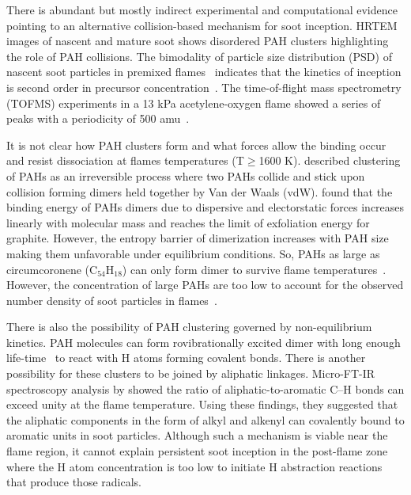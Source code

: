 There is abundant but mostly indirect experimental and computational evidence pointing to an alternative collision-based mechanism for soot inception. HRTEM images of
nascent and mature soot shows disordered PAH clusters highlighting the role of PAH collisions. 
The bimodality of particle size distribution (PSD) of nascent soot particles in premixed flames~\citep{zhao2003measurement} indicates that the kinetics of inception is second order in precursor concentration~\citep{abid2009quantitative}. The time-of-flight mass spectrometry (TOFMS) experiments in a 13 kPa acetylene-oxygen flame showed a series of peaks with a
periodicity of 500 amu~\citep{happold2009soot}. 

It is not clear how PAH clusters form and what forces allow the binding occur and resist dissociation at flames temperatures (T$\ge$1600 K). \citet{frenklach2002reaction} described clustering of PAHs as an irreversible process where two PAHs collide and stick upon collision forming dimers held together by Van der Waals (vdW). \citet{herdman2008intermolecular} found that the binding energy of PAHs dimers due to dispersive and electorstatic forces increases linearly with molecular mass and reaches the limit of exfoliation energy for graphite. However, the entropy barrier of dimerization increases with PAH size making them unfavorable under equilibrium conditions. So, PAHs as large as circumcoronene ($\mathrm{C_{54}H_{18}}$) can only form dimer to survive flame temperatures~\citep{Wang2011}. However, the concentration of large PAHs are too low to account for the observed number density of soot particles in flames~\citep{totton2012quantitative}. 

There is also the possibility of PAH clustering governed by non-equilibrium kinetics. PAH molecules can form rovibrationally excited dimer with long enough life-time~\cite{wong2009molecular} to react with H atoms forming covalent bonds. There is another possibility for these clusters to be joined by aliphatic linkages. Micro-FT-IR spectroscopy analysis by \citet{cain2011evidence} showed the ratio of aliphatic-to-aromatic C–H bonds can exceed unity at the flame temperature. Using these findings, they suggested that
the aliphatic components in the form of alkyl and
alkenyl can covalently bound to aromatic units in soot particles. Although such a mechanism is viable near the flame region, it cannot explain persistent soot inception in the post-flame zone~\citep{zhao2005particle} where the H atom concentration is too low to initiate H abstraction reactions that produce those radicals.


